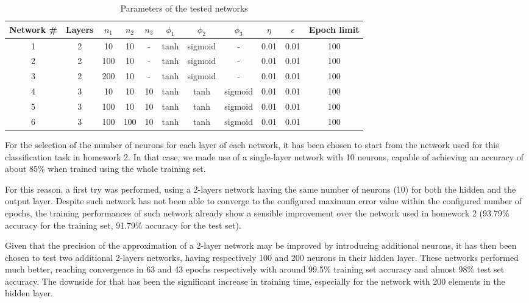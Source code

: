 \documentclass[letterpaper,headings=standardclasses]{scrartcl}
\begin{document}
\begin{table}[h]
    \centering
    \begin{tabular}{|c|c|c|c|c|c|c|c|c|c|c|}
    \hline
    Network \# & Layers & $n_1$ & $n_2$ & $n_3$ & $\phi_1$ & $\phi_2$ & $\phi_3$ & $\eta$ & $\epsilon$ & Epoch limit \\ \hline
    1 & 2 & 10 & 10 & - & tanh & sigmoid & - & 0.01 & 0.01 & 100 \\ \hline
    2 & 2 & 100 & 10 & - & tanh & sigmoid & - & 0.01 & 0.01 & 100 \\ \hline
    3 & 2 & 200 & 10 & - & tanh & sigmoid & - & 0.01 & 0.01 & 100 \\ \hline
    4 & 3 & 10 & 10 & 10 & tanh & tanh & sigmoid & 0.01 & 0.01 & 100 \\ \hline
    5 & 3 & 100 & 10 & 10 & tanh & tanh & sigmoid & 0.01 & 0.01 & 100 \\ \hline
    6 & 3 & 100 & 100 & 10 & tanh & tanh & sigmoid & 0.01 & 0.01 & 100 \\ \hline
    \end{tabular}
    \caption{Parameters of the tested networks}
    \label{net_params}
\end{table}

For the selection of the number of neurons for each layer of each network, it has been chosen to start from the network used for this classification task in homework 2. In that case, we made use of a single-layer network with 10 neurons, capable of achieving an accuracy of about 85\% when trained using the whole training set.

For this reason, a first try was performed, using a 2-layers network having the same number of neurons (10) for both the hidden and the output layer. Despite such network has not been able to converge to the configured maximum error value within the configured number of epochs, the training performances of such network already show a sensible improvement over the network used in homework 2 (93.79\% accuracy for the training set, 91.79\% accuracy for the test set).

Given that the precision of the approximation of a 2-layer network may be improved by introducing additional neurons, it has then been chosen to test two additional 2-layers networks, having respectively 100 and 200 neurons in their hidden layer. These networks performed much better, reaching convergence in 63 and 43 epochs respectively with around 99.5\% training set accuracy and almost 98\% test set accuracy. The downside for that has been the significant increase in training time, especially for the network with 200 elements in the hidden layer.
\end{document}
